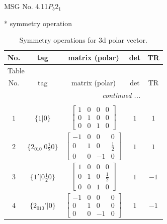 \documentclass[fleqn,8pt]{jsarticle}
\begin{document}
\setcounter{MaxMatrixCols}{32}

\renewcommand{\tablename}{Table~}
\renewcommand{\figurename}{Figure~}
\begin{center}
\LARGE
MSG No. 4.11\quad$P_{b}2_{1}$
\end{center}
* symmetry operation
\renewcommand{\arraystretch}{1.3}
\begin{longtable}{ccccc}
\caption{Symmetry operations for 3d polar vector.}
 \\
 \hline \hline
No. & tag & matrix (polar) & det & TR \\ \hline \endfirsthead

\multicolumn{4}{l}{\tablename\ \thetable{}} \\
 \hline \hline
No. & tag & matrix (polar) & det & TR \\ \hline \endhead

 \hline \hline
\multicolumn{4}{r}{\footnotesize\it continued ...} \\ \endfoot

 \hline \hline
\multicolumn{4}{r}{} \\ \endlastfoot

$ 1 $ & $ \{1|0\} $ & $ \begin{bmatrix} 1 & 0 & 0 & 0 \\ 0 & 1 & 0 & 0 \\ 0 & 0 & 1 & 0 \end{bmatrix} $ & $ 1 $ & $ 1 $ \\ \hline
$ 2 $ & $ \{2{}_{010}|0 \frac{1}{2} 0\} $ & $ \begin{bmatrix} -1 & 0 & 0 & 0 \\ 0 & 1 & 0 & \frac{1}{2} \\ 0 & 0 & -1 & 0 \end{bmatrix} $ & $ 1 $ & $ 1 $ \\ \hline
$ 3 $ & $ \{1{}'|0 \frac{1}{2} 0\} $ & $ \begin{bmatrix} 1 & 0 & 0 & 0 \\ 0 & 1 & 0 & \frac{1}{2} \\ 0 & 0 & 1 & 0 \end{bmatrix} $ & $ 1 $ & $ -1 $ \\ \hline
$ 4 $ & $ \{2{}_{010}{}'|0\} $ & $ \begin{bmatrix} -1 & 0 & 0 & 0 \\ 0 & 1 & 0 & 0 \\ 0 & 0 & -1 & 0 \end{bmatrix} $ & $ 1 $ & $ -1 $ \\
\end{longtable}
\end{document}
